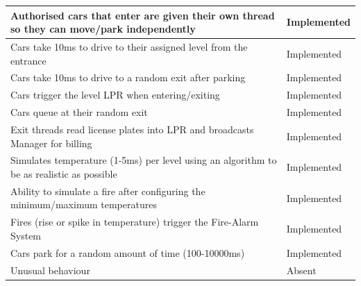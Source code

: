 \documentclass[a4paper]{article}
\begin{document}
\begin{tabular}{|m{24.7em}|l|}
  \hline
  Authorised cars that enter are given their own thread so they can move/park independently & \cellcolor{green!40}Implemented\\
  \hline
  Cars take 10ms to drive to their assigned level from the entrance & \cellcolor{green!40}Implemented\\
  \hline
  Cars take 10ms to drive to a random exit after parking & \cellcolor{green!40}Implemented\\
  \hline
  Cars trigger the level LPR when entering/exiting & \cellcolor{green!40}Implemented\\
  \hline
  Cars queue at their random exit & \cellcolor{green!40}Implemented\\
  \hline
  Exit threads read license plates into LPR and broadcasts Manager for billing & \cellcolor{green!40}Implemented\\
  \hline
  Simulates temperature (1-5ms) per level using an algorithm to be as realistic as possible & \cellcolor{green!40}Implemented\\
  \hline
  Ability to simulate a fire after configuring the minimum/maximum temperatures & \cellcolor{green!40}Implemented\\
  \hline
  Fires (rise or spike in temperature) trigger the Fire-Alarm System & \cellcolor{green!40}Implemented\\
  \hline
  Cars park for a random amount of time (100-10000ms) & \cellcolor{green!40}Implemented\\
  \hline
  Unusual behaviour & \cellcolor{red!40}Absent\\
  \hline
\end{tabular}
\end{document}
